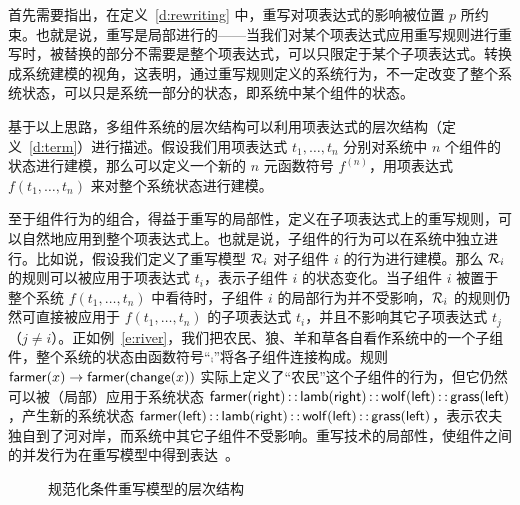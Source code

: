 首先需要指出，在定义~\ref{d:rewriting} 中，重写对项表达式的影响被位置 $p$ 所约束。也就是说，重写是局部进行的——当我们对某个项表达式应用重写规则进行重写时，被替换的部分不需要是整个项表达式，可以只限定于某个子项表达式。转换成系统建模的视角，这表明，通过重写规则定义的系统行为，不一定改变了整个系统状态，可以只是系统一部分的状态，即系统中某个组件的状态。

基于以上思路，多组件系统的层次结构可以利用项表达式的层次结构（定义~\ref{d:term}）进行描述。假设我们用项表达式 $t_1,\ldots,t_n$ 分别对系统中 $n$ 个组件的状态进行建模，那么可以定义一个新的 $n$ 元函数符号 $f^{(n)}$，用项表达式 $f(t_1,\ldots,t_n)$ 来对整个系统状态进行建模。

至于组件行为的组合，得益于重写的局部性，定义在子项表达式上的重写规则，可以自然地应用到整个项表达式上。也就是说，子组件的行为可以在系统中独立进行。比如说，假设我们定义了重写模型 $\cR_i$ 对子组件 $i$ 的行为进行建模。那么 $\cR_i$ 的规则可以被应用于项表达式 $t_i$，表示子组件 $i$ 的状态变化。当子组件 $i$ 被置于整个系统 $f(t_1,\ldots,t_n)$ 中看待时，子组件 $i$ 的局部行为并不受影响，$\cR_i$ 的规则仍然可直接被应用于 $f(t_1,\ldots,t_n)$ 的子项表达式 $t_i$，并且不影响其它子项表达式 $t_j$（$j\not=i$）。正如例~\ref{e:river}，我们把农民、狼、羊和草各自看作系统中的一个子组件，整个系统的状态由函数符号“$\comp$”将各子组件连接构成。规则 $\farmer(x) \ra \farmer(\change(x))$ 实际上定义了“农民”这个子组件的行为，但它仍然可以被（局部）应用于系统状态 $\farmer(\rhs) \comp \lamb(\rhs) \comp \wolf(\lhs) \comp \grass(\lhs)$，产生新的系统状态 $\farmer(\lhs) \comp \lamb(\rhs) \comp \wolf(\lhs) \comp \grass(\lhs)$，表示农夫独自到了河对岸，而系统中其它子组件不受影响。重写技术的局部性，使组件之间的并发行为在重写模型中得到表达~\cite{DBLP:journals/tcs/Marte-OlietM02}。

\begin{figure}[ht]
\centering
{}
\caption{规范化条件重写模型的层次结构}
\label{f:layered-model}
\end{figure}

